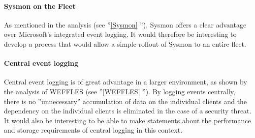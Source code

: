 \paragraph{Sysmon on the Fleet}
As mentioned in the analysis (see ''\ref{Sysmon} ''), Sysmon offers a clear advantage over Microsoft's integrated event logging. It would therefore be interesting to develop a process that would allow a simple rollout of Sysmon to an entire fleet.

\paragraph{Central event logging}
Central event logging is of great advantage in a larger environment, as shown by the analysis of WEFFLES (see ''\ref{WEFFLES} ''). By logging events centrally, there is no ''unnecessary'' accumulation of data on the individual clients and the dependency on the individual clients is eliminated in the case of a security threat. It would also be interesting to be able to make statements about the performance and storage requirements of central logging in this context.
